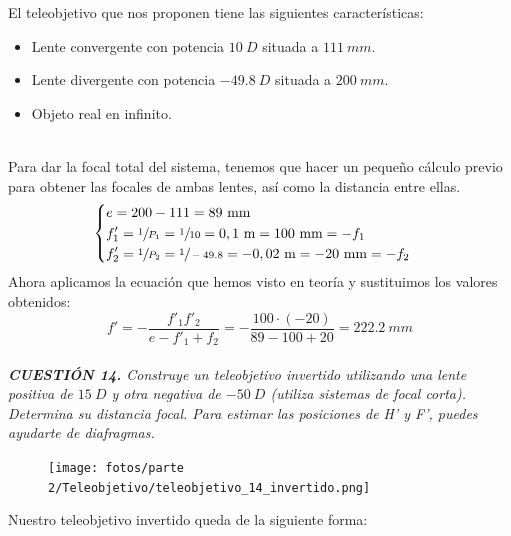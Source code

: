 \documentclass[11pt]{article}
\begin{document}
    \noindent El teleobjetivo que nos proponen tiene las siguientes características:
    \begin{itemize}
        \item Lente convergente con potencia $10\ D$ situada a $111\ mm$.
        \item Lente divergente con potencia $-49.8\ D$ situada a $200\ mm$.
        \item Objeto real en infinito.
    \end{itemize}
    \hspace{0cm}\\
    
    \noindent Para dar la focal total del sistema, tenemos que hacer un pequeño cálculo previo para obtener las focales de ambas lentes, así como la distancia entre ellas.
    \[\begin{cases}
        \begin{aligned}
            &e = 200 - 111 = 89\text{ mm}\\
            &f'_1 = \sfrac{1}{P_1} = \sfrac{1}{10} = 0,1\text{ m} = 100\text{ mm} = -f_1\\
            &f'_2 = \sfrac{1}{P_2} = \sfrac{1}{-49.8} = -0,02\text{ m} = -20\text{ mm} = -f_2
        \end{aligned}
    \end{cases}\]    
    \noindent Ahora aplicamos la ecuación que hemos visto en teoría y sustituimos los valores obtenidos:
    \begin{equation*}
        f' = -\frac{f'_1f'_2}{e-f'_1+f_2} = -\frac{100\cdot (-20)}{89-100+20} = 222.2\ mm
    \end{equation*}
    \\

    \noindent \textit{\textbf{CUESTIÓN 14.} Construye un teleobjetivo invertido utilizando una lente positiva de $15\ D$ y otra negativa de $-50\ D$ (utiliza sistemas de focal corta). Determina su distancia focal. Para estimar las posiciones de H’ y F’, puedes ayudarte de diafragmas.}
    \\

    \begin{figure}
        \vspace{-0.7cm}
        \centering
        \texttt{[image: fotos/parte 2/Teleobjetivo/teleobjetivo\_14\_invertido.png]}
    \end{figure}
    
    \noindent Nuestro teleobjetivo invertido queda de la siguiente forma:\\
\end{document}
